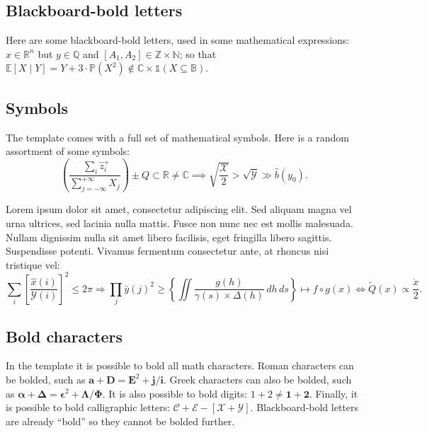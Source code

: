 \documentclass[letterpaper,11pt,leqno]{article}
\begin{document}
\subsection{Blackboard-bold letters} 

Here are some blackboard-bold letters, used in some mathematical expressions: $x \in\mathbb{R}^n$ but $y\in \mathbb{Q}$ and $[A_1,A_2] \in \mathbb{Z} \times \mathbb{N}$; so that $\mathbb{E}[X\mid Y] = Y + 3 \cdot \mathbb{P}(X^2) \notin \mathbb{C} \times \mathbb{1}(X \subseteq \mathbb{B})$.

\subsection{Symbols} 

The template comes with a full set of mathematical symbols. Here is a random assortment of some symbols: 
\begin{equation*}
\left(\frac{\sum_i \vec{z_i}}{\sum_{j=-\infty}^{+\infty} X_j}\right) \pm Q \subset \mathbb{R} \neq \mathbb{C} \implies \sqrt{\frac{\mathcal{X}}{2}} > \sqrt{\mathcal{Y}} \gg \hat{b}(y_0).
\end{equation*}

Lorem ipsum dolor sit amet, consectetur adipiscing elit. Sed aliquam magna vel urna ultrices, sed lacinia nulla mattis. Fusce non nunc nec est mollis malesuada. Nullam dignissim nulla sit amet libero facilisis, eget fringilla libero sagittis. Suspendisse potenti. Vivamus fermentum consectetur ante, at rhoncus nisi tristique vel:
\begin{equation*}
\sum_i \left[\frac{\hat{x}(i)}{\mathcal{Y}(i)}\right]^2 \leq 2\pi \Rightarrow \prod_j \bar{y}(j)^2 \geq \left\{\iint \frac{g(h)}{\gamma(s) \times \Delta(h)}\,dh\,ds \right\} \mapsto f\circ g(x) \iff \tilde{Q}(x) \propto \frac{\dot{x}}{2}.
\end{equation*}

\subsection{Bold characters}

In the template it is possible to bold all math characters. Roman characters can be bolded, such as $\bm{a} + \bm{D} = \bm{E}^2 + \bm{j}/\bm{i}$. Greek characters can also be bolded, such as $\bm{\alpha} + \bm{\Delta} = \bm{\epsilon}^2 + \bm{\Lambda}/\bm{\Phi}$. It is also possible to bold digits: $1 + 2 \neq \bm{1} + \bm{2}$. Finally, it is possible to bold calligraphic letters: $\bm{\mathcal{C}} + \bm{\mathcal{E}} - [\bm{\mathcal{X}}+\bm{\mathcal{Y}}]$. Blackboard-bold letters are already ``bold'' so they cannot be bolded further.
\end{document}
